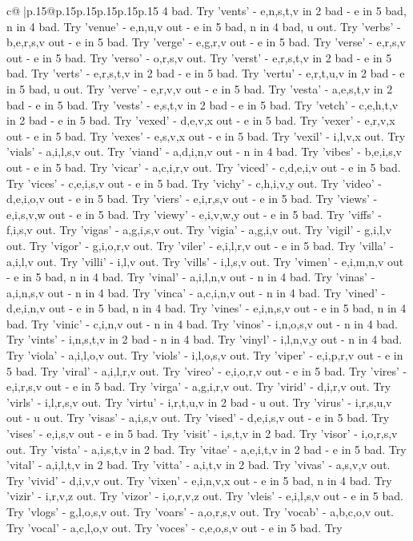 \documentclass{article}
\begin{document}
{\begin{supertabular}{c@{$\;$}|p{.15\linewidth}@{}p{.15\linewidth}p{.15\linewidth}p{.15\linewidth}p{.15\linewidth}p{.15\linewidth}}
{{{4 bad. Try 'vents' {-} e,n,s,t,v in 2 bad {-} e in 5 bad, n in 4 bad. Try 'venue' {-} e,n,u,v out {-} e in 5 bad, n in 4 bad, u out. Try 'verbs' {-} b,e,r,s,v out {-} e in 5 bad. Try 'verge' {-} e,g,r,v out {-} e in 5 bad. Try 'verse' {-} e,r,s,v out {-} e in 5 bad. Try 'verso' {-} o,r,s,v out. Try 'verst' {-} e,r,s,t,v in 2 bad {-} e in 5 bad. Try 'verts' {-} e,r,s,t,v in 2 bad {-} e in 5 bad. Try 'vertu' {-} e,r,t,u,v in 2 bad {-} e in 5 bad, u out. Try 'verve' {-} e,r,v,v out {-} e in 5 bad. Try 'vesta' {-} a,e,s,t,v in 2 bad {-} e in 5 bad. Try 'vests' {-} e,s,t,v in 2 bad {-} e in 5 bad. Try 'vetch' {-} c,e,h,t,v in 2 bad {-} e in 5 bad. Try 'vexed' {-} d,e,v,x out {-} e in 5 bad. Try 'vexer' {-} e,r,v,x out {-} e in 5 bad. Try 'vexes' {-} e,s,v,x out {-} e in 5 bad. Try 'vexil' {-} i,l,v,x out. Try 'vials' {-} a,i,l,s,v out. Try 'viand' {-} a,d,i,n,v out {-} n in 4 bad. Try 'vibes' {-} b,e,i,s,v out {-} e in 5 bad. Try 'vicar' {-} a,c,i,r,v out. Try 'viced' {-} c,d,e,i,v out {-} e in 5 bad. Try 'vices' {-} c,e,i,s,v out {-} e in 5 bad. Try 'vichy' {-} c,h,i,v,y out. Try 'video' {-} d,e,i,o,v out {-} e in 5 bad. Try 'viers' {-} e,i,r,s,v out {-} e in 5 bad. Try 'views' {-} e,i,s,v,w out {-} e in 5 bad. Try 'viewy' {-} e,i,v,w,y out {-} e in 5 bad. Try 'viffs' {-} f,i,s,v out. Try 'vigas' {-} a,g,i,s,v out. Try 'vigia' {-} a,g,i,v out. Try 'vigil' {-} g,i,l,v out. Try 'vigor' {-} g,i,o,r,v out. Try 'viler' {-} e,i,l,r,v out {-} e in 5 bad. Try 'villa' {-} a,i,l,v out. Try 'villi' {-} i,l,v out. Try 'vills' {-} i,l,s,v out. Try 'vimen' {-} e,i,m,n,v out {-} e in 5 bad, n in 4 bad. Try 'vinal' {-} a,i,l,n,v out {-} n in 4 bad. Try 'vinas' {-} a,i,n,s,v out {-} n in 4 bad. Try 'vinca' {-} a,c,i,n,v out {-} n in 4 bad. Try 'vined' {-} d,e,i,n,v out {-} e in 5 bad, n in 4 bad. Try 'vines' {-} e,i,n,s,v out {-} e in 5 bad, n in 4 bad. Try 'vinic' {-} c,i,n,v out {-} n in 4 bad. Try 'vinos' {-} i,n,o,s,v out {-} n in 4 bad. Try 'vints' {-} i,n,s,t,v in 2 bad {-} n in 4 bad. Try 'vinyl' {-} i,l,n,v,y out {-} n in 4 bad. Try 'viola' {-} a,i,l,o,v out. Try 'viols' {-} i,l,o,s,v out. Try 'viper' {-} e,i,p,r,v out {-} e in 5 bad. Try 'viral' {-} a,i,l,r,v out. Try 'vireo' {-} e,i,o,r,v out {-} e in 5 bad. Try 'vires' {-} e,i,r,s,v out {-} e in 5 bad. Try 'virga' {-} a,g,i,r,v out. Try 'virid' {-} d,i,r,v out. Try 'virls' {-} i,l,r,s,v out. Try 'virtu' {-} i,r,t,u,v in 2 bad {-} u out. Try 'virus' {-} i,r,s,u,v out {-} u out. Try 'visas' {-} a,i,s,v out. Try 'vised' {-} d,e,i,s,v out {-} e in 5 bad. Try 'vises' {-} e,i,s,v out {-} e in 5 bad. Try 'visit' {-} i,s,t,v in 2 bad. Try 'visor' {-} i,o,r,s,v out. Try 'vista' {-} a,i,s,t,v in 2 bad. Try 'vitae' {-} a,e,i,t,v in 2 bad {-} e in 5 bad. Try 'vital' {-} a,i,l,t,v in 2 bad. Try 'vitta' {-} a,i,t,v in 2 bad. Try 'vivas' {-} a,s,v,v out. Try 'vivid' {-} d,i,v,v out. Try 'vixen' {-} e,i,n,v,x out {-} e in 5 bad, n in 4 bad. Try 'vizir' {-} i,r,v,z out. Try 'vizor' {-} i,o,r,v,z out. Try 'vleis' {-} e,i,l,s,v out {-} e in 5 bad. Try 'vlogs' {-} g,l,o,s,v out. Try 'voars' {-} a,o,r,s,v out. Try 'vocab' {-} a,b,c,o,v out. Try 'vocal' {-} a,c,l,o,v out. Try 'voces' {-} c,e,o,s,v out {-} e in 5 bad. Try }}}
\end{supertabular}}
\end{document}
